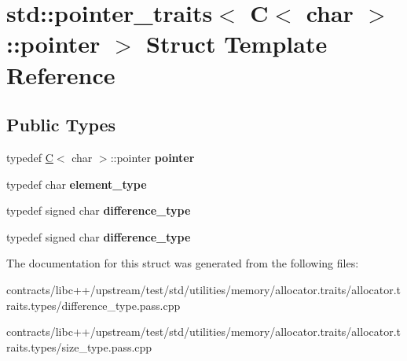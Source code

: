 \hypertarget{structstd_1_1pointer__traits_3_01_c_3_01char_01_4_1_1pointer_01_4}{}\section{std\+:\+:pointer\+\_\+traits$<$ C$<$ char $>$\+:\+:pointer $>$ Struct Template Reference}
\label{structstd_1_1pointer__traits_3_01_c_3_01char_01_4_1_1pointer_01_4}
\subsection*{Public Types}
\begin{DoxyCompactItemize}
\item 
\mbox{\label{structstd_1_1pointer__traits_3_01_c_3_01char_01_4_1_1pointer_01_4_aee31d7bd80caeb547d0fbc9bd864dab9}} 
typedef \mbox{\hyperlink{struct_c}{C}}$<$ char $>$\+::pointer {\bfseries pointer}
\item 
\mbox{\label{structstd_1_1pointer__traits_3_01_c_3_01char_01_4_1_1pointer_01_4_a2181b30c6e21109e8dbf87f263e135e2}} 
typedef char {\bfseries element\+\_\+type}
\item 
\mbox{\label{structstd_1_1pointer__traits_3_01_c_3_01char_01_4_1_1pointer_01_4_a55e14db3a2ea125b3086c0f6b6e9088e}} 
typedef signed char {\bfseries difference\+\_\+type}
\item 
\mbox{\label{structstd_1_1pointer__traits_3_01_c_3_01char_01_4_1_1pointer_01_4_a55e14db3a2ea125b3086c0f6b6e9088e}} 
typedef signed char {\bfseries difference\+\_\+type}
\end{DoxyCompactItemize}


The documentation for this struct was generated from the following files\+:\begin{DoxyCompactItemize}
\item 
contracts/libc++/upstream/test/std/utilities/memory/allocator.\+traits/allocator.\+traits.\+types/difference\+\_\+type.\+pass.\+cpp\item 
contracts/libc++/upstream/test/std/utilities/memory/allocator.\+traits/allocator.\+traits.\+types/size\+\_\+type.\+pass.\+cpp\end{DoxyCompactItemize}
